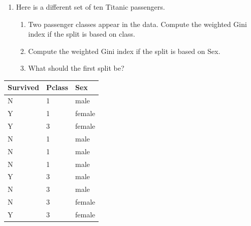 \documentclass[
]{book}
\providecommand{\tightlist}{%
  \setlength{\itemsep}{0pt}\setlength{\parskip}{0pt}}
\theoremstyle{definition}
\theoremstyle{definition}
\theoremstyle{definition}
\theoremstyle{definition}
\theoremstyle{remark}
\begin{document}
\begin{enumerate}
\def\labelenumi{\arabic{enumi}.}
\setcounter{enumi}{7}
\tightlist
\item
  Here is a different set of ten Titanic passengers.

  \begin{enumerate}
  \def\labelenumii{\alph{enumii}.}
  \tightlist
  \item
    Two passenger classes appear in the data. Compute the weighted Gini index if the split is based on class.
  \item
    Compute the weighted Gini index if the split is based on Sex.
  \item
    What should the first split be?
  \end{enumerate}
\end{enumerate}

\begin{longtable}[]{@{}lll@{}}
\toprule\noalign{}
Survived & Pclass & Sex \\
\midrule\noalign{}
\endhead
\bottomrule\noalign{}
\endlastfoot
N & 1 & male \\
Y & 1 & female \\
Y & 3 & female \\
N & 1 & male \\
N & 1 & male \\
N & 1 & male \\
Y & 3 & male \\
N & 3 & male \\
N & 3 & female \\
Y & 3 & female \\
\end{longtable}
\end{document}
